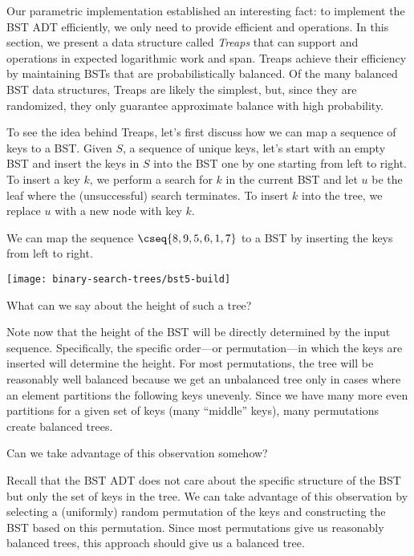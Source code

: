 Our parametric implementation established an interesting fact: to
implement the BST ADT efficiently, we only need to provide efficient
 and  operations.  In this section, we
present a data structure called {\em Treaps} that can support
 and  operations in expected logarithmic work
and span.
%
Treaps achieve their efficiency by maintaining BSTs that are
probabilistically balanced. Of the many balanced BST data structures,
Treaps are likely the simplest, but, since they are randomized, they
only guarantee approximate balance with high probability.

\begin{notesonly}

  To see the idea behind Treaps, let's first discuss how we can map a
  sequence of keys to a BST. Given $S$, a sequence of unique keys,
  let's start with an empty BST and insert the keys in $S$ into the
  BST one by one starting from left to right.  To insert a key $k$, we
  perform a search for $k$ in the current BST and let $u$ be the leaf
  where the (unsuccessful) search terminates.  To insert $k$ into the
  tree, we replace $u$ with a new node with key $k$.

\begin{simpleexample}

We can map the sequence $\cseq{8,9,5,6,1,7}$ to a BST by inserting the keys from
left to right.

\begin{center}
\texttt{[image: binary-search-trees/bst5-build]}
\end{center}

\end{simpleexample}

\begin{question}
What can we say about the height of such a tree? 
\end{question}
Note now that the height of the BST will be directly determined by the
input sequence.  Specifically, the specific order---or
permutation---in which the keys are inserted will determine the
height.  For most permutations, the tree will be reasonably well
balanced because we get an unbalanced tree only in cases where an
element partitions the following keys unevenly.  Since we have
many more even partitions for a given set of keys (many ``middle''
keys), many permutations create balanced trees.

\begin{question}
Can we take advantage of this observation somehow? 
\end{question}
%
Recall that the BST ADT does not care about the specific structure of
the BST but only the set of keys in the tree. We can take advantage of
this observation by selecting a (uniformly) random permutation of the keys and
constructing the BST based on this permutation.  Since most
permutations give us reasonably balanced trees, this approach should
give us a balanced tree.



\end{notesonly}
